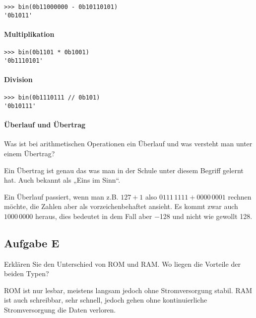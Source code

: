 \begin{verbatim}
>>> bin(0b11000000 - 0b10110101)
'0b1011'
\end{verbatim}

\paragraph{Multiplikation}

\begin{verbatim}
>>> bin(0b1101 * 0b1001)
'0b1110101'
\end{verbatim}

\paragraph{Division}

\begin{verbatim}
>>> bin(0b1110111 // 0b101)
'0b10111'
\end{verbatim}

\paragraph{Überlauf und Übertrag}

\begin{problem}
    Was ist bei arithmetischen Operationen ein Überlauf und was versteht man
    unter einem Übertrag?
\end{problem}

Ein Übertrag ist genau das was man in der Schule unter diesem Begriff gelernt
hat. Auch bekannt als „Eins im Sinn“.

Ein Überlauf passiert, wenn man z.B. $127 + 1$ also $0111\,1111 + 0000\,0001$
rechnen möchte, die Zahlen aber als vorzeichenbehaftet ansieht. Es kommt zwar
auch $1000\,0000$ heraus, dies bedeutet in dem Fall aber \num{-128} und nicht
wie gewollt 128.

\subsection{Aufgabe E}

\begin{problem}
	Erklären Sie den Unterschied von ROM und RAM. Wo liegen die Vorteile der
	beiden Typen?
\end{problem}

ROM ist nur lesbar, meistens langsam jedoch ohne Stromversorgung stabil. RAM
ist auch schreibbar, sehr schnell, jedoch gehen ohne kontinuierliche
Stromversorgung die Daten verloren.

